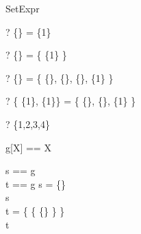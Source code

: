 \begin{zsection}
  \SECTION SetExpr
\end{zsection}

\begin{zed} \vdash? \{\} = \{1\} \end{zed}
\begin{zed} \vdash? \{\} = \{ \{1\} \} \end{zed}
\begin{zed} \vdash? \{\} = \{ \{\}, \{\}, \{\}, \{1\} \} \end{zed}
\begin{zed} \vdash? \{ \{1\}, \{1\}\} = \{ \{\}, \{\}, \{1\} \} \end{zed}
\begin{zed} \vdash? \{1,2,3,4\} \in \power \nat \end{zed}

\begin{zed}
  g[X] == X
\end{zed}

\begin{axdef}
  s == g\\
  t == g
\where
  s = \{\}\\
  s \in \power \nat\\
  t = \{ \{ \{\} \} \}\\
  t \in \power \power \power \nat
\end{axdef}
